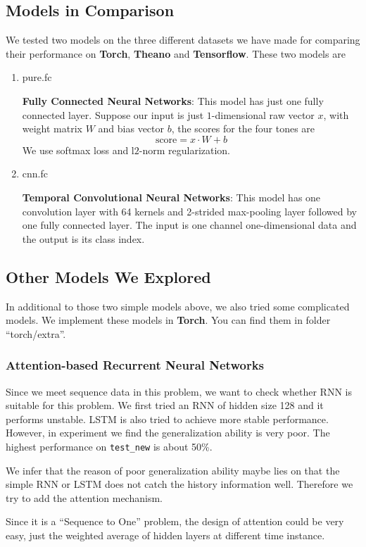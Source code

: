 \documentclass[a4paper]{article}
\begin{document}
\subsection{Models in Comparison}
We tested two models on the three different datasets we have made for comparing their performance on {\bf Torch}, {\bf Theano} and {\bf Tensorflow}. These two models are
\begin{enumerate}
\item pure.fc

	{\bf Fully Connected Neural Networks}: This model has just one fully connected layer. Suppose our input is just $1$-dimensional raw vector $x$, with weight matrix $W$ and bias vector $b$, the scores for the four tones are
	\[
		\text{score} = x \cdot W + b
	\]
	We use softmax loss and l$2$-norm regularization.

\item cnn.fc

	{\bf Temporal Convolutional Neural Networks}: This model has one convolution layer with 64 kernels and 2-strided max-pooling layer followed by one fully connected layer. The input is one channel one-dimensional data and the output is its class index.

\end{enumerate}

\subsection{Other Models We Explored}
\label{other}
In additional to those two simple models above, we also tried some complicated models. We implement these models in {\bf Torch}. You can find them in folder ``torch/extra''.
\subsubsection{Attention-based Recurrent Neural Networks}
Since we meet sequence data in this problem, we want to check whether RNN is suitable for this problem. We first tried an RNN of  hidden size 128 and it performs unstable. LSTM is also tried to achieve more stable performance. However, in experiment we find the generalization ability is very poor. The highest performance on \texttt{test\_new} is about 50\%.

We infer that the reason of poor generalization ability maybe lies on that the simple RNN or LSTM does not catch the history information well. Therefore we try to add the attention mechanism.

Since it is a ``Sequence to One'' problem, the design of attention could be very easy, just the weighted average of hidden layers at different time instance. 
\end{document}
